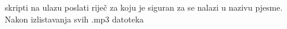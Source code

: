 \documentclass{exam}
\begin{document}
                                                                                                                                skripti
                                                                                                                                na
                                                                                                                                ulazu
                                                                                                                                poslati
                                                                                                                                riječ
                                                                                                                                za
                                                                                                                                koju
                                                                                                                                je
                                                                                                                                siguran
                                                                                                                                za
                                                                                                                                se
                                                                                                                                nalazi
                                                                                                                                u
                                                                                                                                nazivu
                                                                                                                                pjesme.
                                                                                                                                Nakon
                                                                                                                                izlistavanja
                                                                                                                                svih
                                                                                                                                .mp3
                                                                                                                                datoteka
\end{document}
